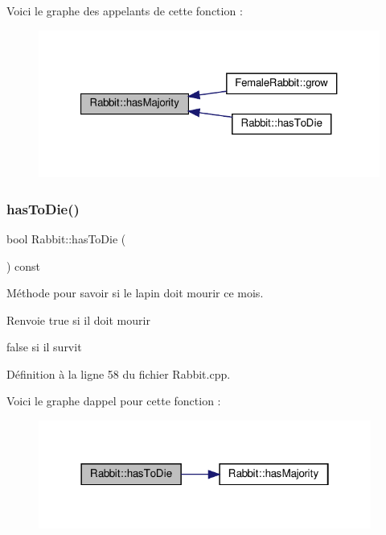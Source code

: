 Voici le graphe des appelants de cette fonction \+:
\nopagebreak
\begin{figure}[H]
\begin{center}
\leavevmode
\includegraphics[width=321pt]{classRabbit_a8087ee3ab0acaa6108e6982933b0f79a_icgraph}
\end{center}
\end{figure}
\mbox{\label{classRabbit_a82cf75bd520aaa775fadbf103fc12499}} 
\subsubsection{\texorpdfstring{has\+To\+Die()}{hasToDie()}}
{\footnotesize\ttfamily bool Rabbit\+::has\+To\+Die (\begin{DoxyParamCaption}{ }\end{DoxyParamCaption}) const}



Méthode pour savoir si le lapin doit mourir ce mois. 

\begin{DoxyReturn}{Renvoie}
true si il doit mourir 

false si il survit 
\end{DoxyReturn}


Définition à la ligne 58 du fichier Rabbit.\+cpp.

Voici le graphe d\textquotesingle{}appel pour cette fonction \+:
\nopagebreak
\begin{figure}[H]
\begin{center}
\leavevmode
\includegraphics[width=310pt]{classRabbit_a82cf75bd520aaa775fadbf103fc12499_cgraph}
\end{center}
\end{figure}
\mbox{\label{classRabbit_a913437a589519afdb9249825bd6f03bd}} 
